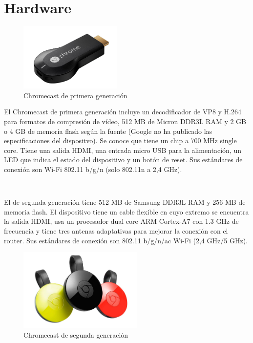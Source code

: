 \section{Hardware}

\begin{figure}[h]
	\centering
	\includegraphics[width=0.45\textwidth]{./Imagenes/chromecast1gen.jpg}
	\caption{Chromecast de primera generación}\label{fig:1gen}
\end{figure}

El Chromecast de primera generación incluye un decodificador de VP8 y H.264 para formatos de compresión de vídeo, 512 MB de Micron DDR3L RAM y 2 GB o 4 GB de memoria flash según la fuente (Google no ha publicado las especificaciones del dispositvo).
Se conoce que tiene un chip a 700 MHz single core.
Tiene una salida HDMI, una entrada micro USB para la alimentación, un LED que indica el estado del dispositivo y un botón de reset.
Sus estándares de conexión son Wi-Fi 802.11 b/g/n (solo 802.11n a 2,4 GHz).

\

El de segunda generación tiene 512 MB de Samsung DDR3L RAM y 256 MB de memoria flash.
El dispositivo tiene un cable flexible en cuyo extremo se encuentra la salida HDMI, usa un procesador dual core ARM Cortex-A7 con 1.3 GHz de frecuencia y tiene tres antenas adaptativas para mejorar la conexión con el router.
Sus estándares de conexión son 802.11 b/g/n/ac Wi-Fi (2,4 GHz/5 GHz).

\begin{figure}[h]
	\centering
	\includegraphics[width=0.55\textwidth]{./Imagenes/chromecast2gen.jpg}
	\caption{Chromecast de segunda generación}\label{fig:2gen}
\end{figure}

